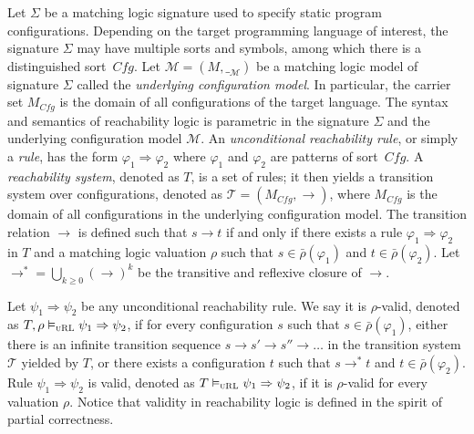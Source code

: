\documentclass[acmsmall,review,anonymous]{acmart}
\newcommand{\To}{\Rightarrow}
\newcommand{\sig}{\mathbb{\Sigma}}
\newcommand{\MM}{\mathcal{M}}
\newcommand{\interp}[1]{\__{#1}}
\newcommand{\interpM}{\interp{\MM}}
\newcommand{\barrho}{\bar{\rho}}
\newcommand{\uRL}{\textsc{uRL}}
\newcommand{\Cfg}{\mathit{Cfg}}
\newcommand{\TT}{\mathcal{T}}
\begin{document}
Let $\sig$ be a matching logic signature 
used to specify static program configurations.
Depending on the target programming language of interest,
the signature $\sig$
may have multiple sorts and symbols, among which there is 
a distinguished sort~$\Cfg$.
Let $\MM = (M, \interpM)$ be a matching logic model of signature $\sig$
called the \emph{underlying configuration model}.
In particular, the carrier set $M_\Cfg$ is the domain of all configurations
of the target language.
The syntax and semantics of reachability logic is parametric in
the signature $\sig$ and the underlying configuration model $\MM$.
An \emph{unconditional reachability rule}, or simply a \emph{rule}, has the form
$\varphi_1 \To \varphi_2$ where $\varphi_1$ and $\varphi_2$ are 
patterns of sort~$\Cfg$.
A \emph{reachability system}, denoted as $T$, is a set of rules;
it then yields a transition system over configurations,
denoted as $\TT = (M_\Cfg, \to)$,
where $M_\Cfg$ is the domain of all configurations in the
underlying configuration model.
The transition relation $\to$ is defined such that
$s \to t$ if and only if
there exists a rule $\varphi_1 \To \varphi_2$ in $T$
and a matching logic valuation $\rho$ such that
$s \in \barrho(\varphi_1)$ and $t \in \barrho(\varphi_2)$.
Let $\to^* = \bigcup_{k \ge 0} (\to)^k$ 
be the transitive and reflexive closure of ${\to}$.

Let $\psi_1 \To \psi_2$ be any unconditional reachability rule.
We say it is $\rho$-valid,
denoted as 
$T,\rho \vDash_\uRL \psi_1 \To \psi_2$,
if for every configuration $s$ such that $s \in \barrho(\varphi_1)$,
either there is an infinite transition sequence
$s \to s' \to s'' \to \dots$ in the transition system $\TT$ yielded by $T$,
or there exists a configuration $t$
such that $s \to^* t$ and $t \in \barrho(\varphi_2)$.
Rule $\psi_1 \To \psi_2$ is valid, denoted as $T \vDash_\uRL \psi_1 \To \psi_2$,
if it is $\rho$-valid for every valuation $\rho$.
Notice that validity in reachability logic is defined
in the spirit of partial correctness.
\end{document}

